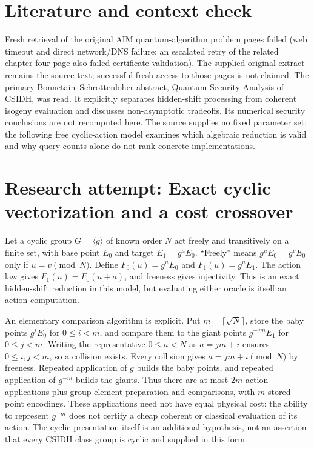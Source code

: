 \documentclass[11pt]{article}
\begin{document}
\section{Literature and context check}
Fresh retrieval of the original AIM quantum-algorithm problem pages failed (web timeout and direct network/DNS failure; an escalated retry of the related chapter-four page also failed certificate validation). The supplied original extract remains the source text; successful fresh access to those pages is not claimed. The primary Bonnetain--Schrottenloher abstract, Quantum Security Analysis of CSIDH, was read. It explicitly separates hidden-shift processing from coherent isogeny evaluation and discusses non-asymptotic tradeoffs. Its numerical security conclusions are not recomputed here. The source supplies no fixed parameter set; the following free cyclic-action model examines which algebraic reduction is valid and why query counts alone do not rank concrete implementations.
\section{Research attempt: Exact cyclic vectorization and a cost crossover}
Let a cyclic group $G=\langle g\rangle$ of known order $N$ act freely and transitively on a finite set, with base point $E_0$ and target $E_1=g^aE_0$. ``Freely'' means $g^uE_0=g^vE_0$ only if $u=v\pmod N$. Define $F_0(u)=g^uE_0$ and $F_1(u)=g^uE_1$. The action law gives $F_1(u)=F_0(u+a)$, and freeness gives injectivity. This is an exact hidden-shift reduction in this model, but evaluating either oracle is itself an action computation.

An elementary comparison algorithm is explicit. Put $m=\lceil\sqrt N\rceil$, store the baby points $g^iE_0$ for $0\leq i<m$, and compare them to the giant points $g^{-jm}E_1$ for $0\leq j<m$. Writing the representative $0\leq a<N$ as $a=jm+i$ ensures $0\leq i,j<m$, so a collision exists. Every collision gives $a=jm+i\pmod N$ by freeness. Repeated application of $g$ builds the baby points, and repeated application of $g^{-m}$ builds the giants. Thus there are at most $2m$ action applications plus group-element preparation and comparisons, with $m$ stored point encodings. These applications need not have equal physical cost: the ability to represent $g^{-m}$ does not certify a cheap coherent or classical evaluation of its action. The cyclic presentation itself is an additional hypothesis, not an assertion that every CSIDH class group is cyclic and supplied in this form.
\end{document}

